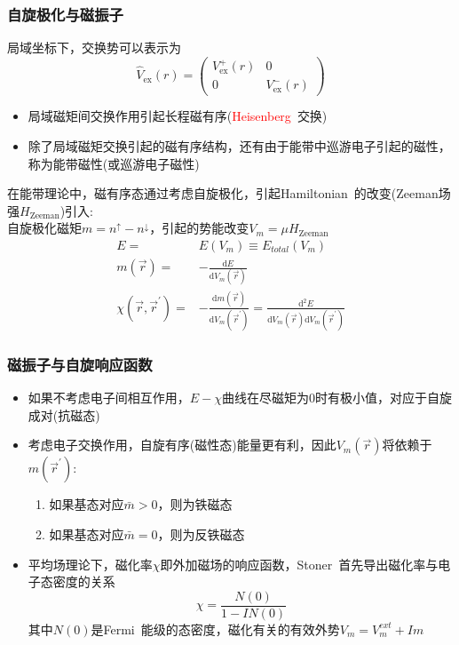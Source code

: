 \documentclass[cjk,slidestop,compress,mathserif,blue]{beamer}
\begin{document}
\frame
{
	\frametitle{自旋极化与磁振子}
			局域坐标下，交换势可以表示为
			\begin{displaymath}
				\hat{V}_{\mathrm{ex}}(r)=\left(
				\begin{matrix}
					V_{\mathrm{ex}}^+(r) &0\\
					0 &V_{\mathrm{ex}}^-(r)
				\end{matrix}\right)
			\end{displaymath}
	\begin{itemize}
		\item 局域磁矩间交换作用引起长程磁有序(\textcolor{red}{\textrm{Heisenberg~}}交换)
		\item 除了局域磁矩交换引起的磁有序结构，还有由于能带中巡游电子引起的磁性，称为能带磁性(或巡游电子磁性)
	\end{itemize}
	在能带理论中，磁有序态通过考虑自旋极化，引起\textrm{Hamiltonian~}的改变(\textrm{Zeeman}场强$H_{\mathrm{Zeeman}}$)引入:\\
	自旋极化磁矩$m=n^{\uparrow}-n^{\downarrow}$，引起的势能改变$V_m=\mu H_{\mathrm{Zeeman}}$
	\begin{displaymath}
		\begin{aligned}
			E=&E(V_m)\equiv E_{total}(V_m)\\
			m(\vec r)=&-\frac{\mathrm{d}E}{\mathrm{d}V_m(\vec r)}\\
			\chi(\vec r,\vec r^{\prime})=&-\frac{\mathrm{d}m(\vec r)}{\mathrm{d}V_m(\vec r^{\prime})}=\frac{\mathrm{d}^2E}{\mathrm{d}V_m(\vec r)\mathrm{d}V_m(\vec r^{\prime})}
		\end{aligned}
	\end{displaymath}
}

\frame
{
	\frametitle{磁振子与自旋响应函数}
	\begin{itemize}
		\item 如果不考虑电子间相互作用，$E-\chi$曲线在尽磁矩为0时有极小值，对应于自旋成对(抗磁态)
		\item 考虑电子交换作用，自旋有序(磁性态)能量更有利，因此$V_m(\vec r)$将依赖于$m(\vec r^{\prime})$:\\
			\begin{enumerate}
				\item 如果基态对应$\bar m>0$，则为铁磁态
				\item 如果基态对应$\bar m=0$，则为反铁磁态
			\end{enumerate}
		\item 平均场理论下，磁化率$\chi$即外加磁场的响应函数，\textrm{Stoner~}首先导出磁化率与电子态密度的关系
			\begin{displaymath}
				\chi=\frac{N(0)}{1-IN(0)}
			\end{displaymath}
			其中$N(0)$是\textrm{Fermi~}能级的态密度，磁化有关的有效外势$V_m=V_m^{ext}+Im$
	\end{itemize}
}
\end{document}
